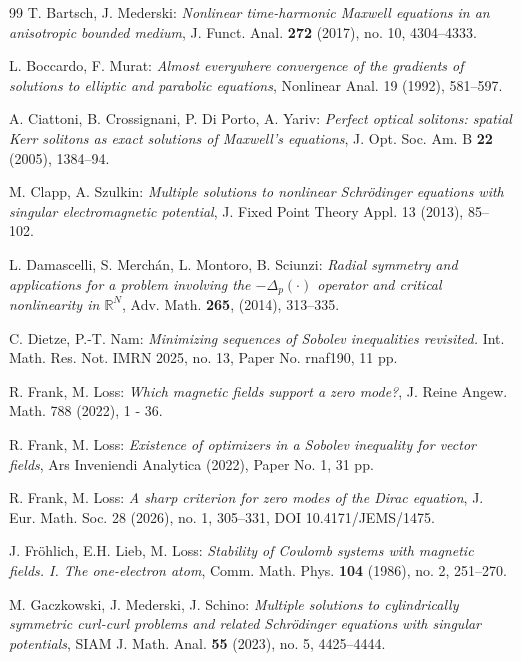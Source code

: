 \documentclass[12pt,leqno,twoside]{amsart}
\def\R{\mathbb{R}}
\numberwithin{equation}{section}
\begin{document}
{\begin{thebibliography}{99}
 T. Bartsch, J. Mederski:
{\em Nonlinear time-harmonic Maxwell equations in an anisotropic bounded medium},
J. Funct. Anal. {\bf 272} (2017), no. 10, 4304--4333.


 L. Boccardo, F. Murat: \emph{Almost everywhere convergence of the gradients of solutions to elliptic and parabolic equations}, Nonlinear Anal. 19 (1992), 581--597.
	

 A. Ciattoni, B. Crossignani, P. Di Porto, A. Yariv: {\em Perfect optical solitons: spatial Kerr solitons as exact solutions of Maxwell's equations}, J. Opt. Soc. Am. B {\bf 22} (2005), 1384--94.

 M. Clapp, A. Szulkin: \emph{Multiple solutions to nonlinear Schr\"odinger equations with singular electromagnetic potential}, J. Fixed Point Theory Appl. 13 (2013), 85--102.
	


 L. Damascelli, S. Merch\'{a}n, L. Montoro, B. Sciunzi: {\em Radial symmetry and applications for a problem involving the $-\Delta_p(\cdot)$ operator and critical nonlinearity in $\R^N$}, Adv. Math. {\bf 265}, (2014), 313--335.


 C. Dietze, P.-T. Nam:
{\em Minimizing sequences of Sobolev inequalities revisited.} Int. Math. Res. Not. IMRN 2025, no. 13, Paper No. rnaf190, 11 pp.

 R. Frank, M. Loss: {\em Which magnetic fields support a zero mode?}, J. Reine Angew. Math. 788 (2022), 1 - 36.

 R. Frank, M. Loss: {\em Existence of optimizers in a Sobolev inequality for vector fields}, Ars Inveniendi Analytica (2022), Paper No. 1, 31 pp. 
	
 R. Frank, M. Loss: {\em A sharp criterion for zero modes of the Dirac equation}, J. Eur. Math. Soc. 28 (2026), no. 1, 305--331, DOI 10.4171/JEMS/1475.

 J. Fr\"ohlich, E.H. Lieb, M. Loss: {\em Stability of Coulomb systems with magnetic fields. I. The one-electron atom}, Comm. Math. Phys. {\bf 104} (1986), no. 2, 251--270.

 M. Gaczkowski, J. Mederski, J. Schino: {\em Multiple solutions to cylindrically symmetric curl-curl problems and related Schr\"odinger equations with singular potentials}, SIAM J. Math. Anal. {\bf 55} (2023), no. 5, 4425--4444.




\end{thebibliography}}
\end{document}
